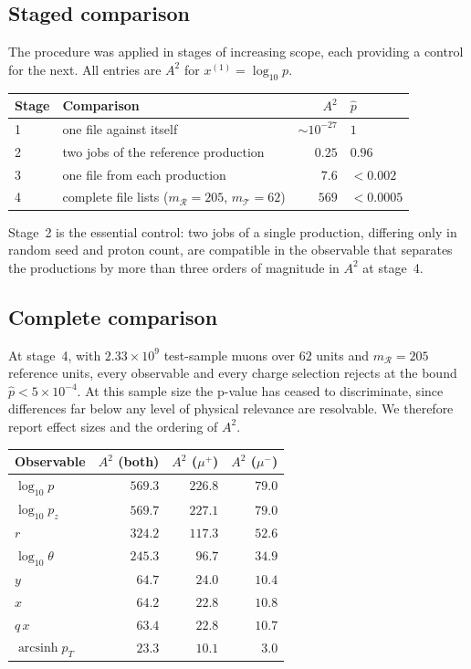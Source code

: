 \documentclass[11pt,a4paper]{article}
\theoremstyle{definition}
\theoremstyle{plain}
\theoremstyle{remark}
\newcommand{\Rr}{\mathcal{R}}
\newcommand{\Tt}{\mathcal{T}}
\begin{document}
\subsection{Staged comparison}

The procedure was applied in stages of increasing scope, each providing a
control for the next. All entries are $A^{2}$ for $x^{(1)} = \log_{10} p$.

\begin{center}
\begin{tabular}{@{}llrl@{}}
\toprule
Stage & Comparison & $A^{2}$ & $\hat{p}$ \\
\midrule
1 & one file against itself & $\sim 10^{-27}$ & $1$ \\
2 & two jobs of the reference production & $0.25$ & $0.96$ \\
3 & one file from each production & $7.6$ & $<0.002$ \\
4 & complete file lists ($m_\Rr = 205$, $m_\Tt = 62$) & $569$ & $<0.0005$ \\
\bottomrule
\end{tabular}
\end{center}

Stage~2 is the essential control: two jobs of a single production, differing
only in random seed and proton count, are compatible in the observable that
separates the productions by more than three orders of magnitude in $A^{2}$ at
stage~4.

\subsection{Complete comparison}

At stage~4, with $2.33\times10^{9}$ test-sample muons over $62$ units and
$m_\Rr = 205$ reference units, every observable and every charge selection
rejects at the bound $\hat{p} < 5\times10^{-4}$. At this sample size the
p-value has ceased to discriminate, since differences far below any level of
physical relevance are resolvable. We therefore report effect sizes and the
ordering of $A^{2}$.

\begin{center}
\begin{tabular}{@{}lrrr@{}}
\toprule
Observable & $A^{2}$ (both) & $A^{2}$ ($\mu^+$) & $A^{2}$ ($\mu^-$) \\
\midrule
$\log_{10} p$              & $569.3$ & $226.8$ & $79.0$ \\
$\log_{10} p_z$            & $569.7$ & $227.1$ & $79.0$ \\
$r$                        & $324.2$ & $117.3$ & $52.6$ \\
$\log_{10}\theta$          & $245.3$ & $96.7$  & $34.9$ \\
$y$                        & $64.7$  & $24.0$  & $10.4$ \\
$x$                        & $64.2$  & $22.8$  & $10.8$ \\
$q\,x$                     & $63.4$  & $22.8$  & $10.7$ \\
$\operatorname{arcsinh} p_T$ & $23.3$ & $10.1$  & $3.0$ \\
\bottomrule
\end{tabular}
\end{center}
\end{document}
